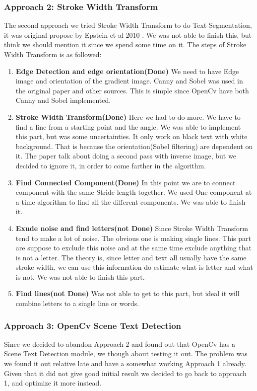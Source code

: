 \documentclass[11pt,a4paper,UKenglish]{article}
\begin{document}
\subsubsection{Approach 2: Stroke Width Transform}
The second approach we tried Stroke Width Transform to do Text Segmentation, it was original propose by Epstein et al 2010 \cite{epshtein_stroke_2010}. We was not able to finish this, but think we should mention it since we spend some time on it. The steps of Stroke Width Transform is as followed:
\begin{enumerate}
  \item \textbf{Edge Detection and edge orientation(Done)}
  We need to have Edge image and orientation of the gradient image.
  Canny and Sobel was used in the original paper and other sources. This is simple since OpenCv have both Canny and Sobel implemented.
  \item \textbf{Stroke Width Transform(Done)}
  Here we had to do more. We have to find a line from a starting point and the angle. We was able to implement this part, but was some uncertainties. It only work on black text with white background. That is because the orientation(Sobel filtering) are dependent on it. The paper talk about doing a second pass with inverse image, but we decided to ignore it, in order to come farther in the algorithm.
  \item \textbf{Find Connected Component(Done)}
  In this point we are to connect component with the same Stride length together. We used One component at a time algorithm to find all the different components. We was able to finish it.
  \item \textbf{Exude noise and find letters(not Done)}
  Since Stroke Width Transform tend to make a lot of noise. The obvious one is making single lines. This part are suppose to exclude this noise and at the same time exclude anything that is not a letter. The theory is, since letter and text all usually have the same stroke width, we can use this information do estimate what is letter and what is not. We was not able to finish this part.
  \item \textbf{Find lines(not Done)}
  Was not able to get to this part, but ideal it will combine letters to a single line or words.
\end{enumerate}

\subsubsection{Approach 3: OpenCv Scene Text Detection}
Since we decided to abandon Approach 2 and found out that OpenCv has a Scene Text Detection module, we though about testing it out. The problem was we found it out relative late and have a somewhat working Approach 1 already. Given that it did not give good initial result we decided to go back to approach 1, and optimize it more instead.
\end{document}
